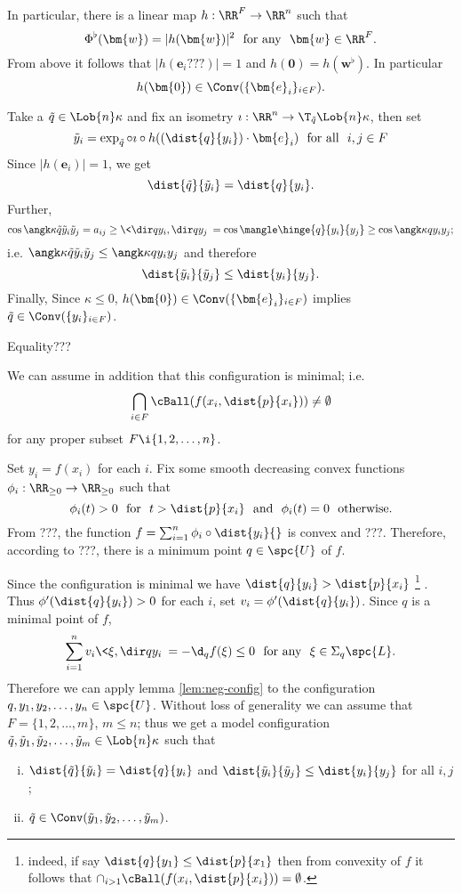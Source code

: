 {In particular, there is a linear map $h:\RR^F\to \RR^n$ such that
$$\Phi^\flat(\bm{w})=|h(\bm{w})|^2 \ \ \text{for any}\ \ \bm{w}\in \RR^F.$$
From above it follows that $|h(\bm{e}_i???)|=1$ and $h(\bm{0})=h(\bm{w}^\flat)$. 
In particular 
$$h(\bm{0}) \in \Conv(\{\bm{e}_i\}_{i\in F}).$$

Take a $\tilde q\in \Lob{n}\kappa$ and fix an isometry $\imath:\RR^n\to \T_{\tilde q}\Lob{n}\kappa$, then set 
$$\tilde y_i=\exp_{\tilde q}\circ\imath\circ h((\dist{q}{y_i})\cdot \bm{e}_i)\ \ \text{for all}\ \ i,j\in F$$ 
Since $|h(\bm{e}_i)|=1$, we get
$$\dist{\tilde q}{\tilde y_i}=\dist{q}{y_i}.$$ 
Further,
$$\cos\angk\kappa{\tilde q}{\tilde y_i}{\tilde y_j}
=a_{i j}
\ge\<\dir q{y_i},\dir q{y_j}\>
= \cos\mangle\hinge{q}{y_i}{y_j}
\ge\cos\angk\kappa{q}{y_i}{y_j};
$$
i.e. $\angk\kappa{\tilde q}{\tilde y_i}{\tilde y_j}\le \angk\kappa{q}{y_i}{y_j}$ and therefore
$$\dist{\tilde y_i}{\tilde y_j}\le \dist{y_i}{y_j}.$$
Finally, Since $\kappa\le 0$, $h(\bm{0}) \in \Conv(\{\bm{e}_i\}_{i\in F})$ implies
$\tilde q\in\Conv(\{y_i\}_{i\in F})$.

Equality???
\qeds












We can assume in addition that this configuration is minimal; 
i.e. 
$$\bigcap_{i\in F} \cBall(f(x_i,\dist{p}{x_i}))\not=\emptyset$$
for any proper subset $F\i\{1,2,\dots,n\}$.

Set $y_i=f(x_i)$ for each $i$.
Fix some smooth decreasing convex functions $\phi_i:\RR_{\ge0}\to\RR_{\ge0}$ such that 
$$\phi_i(t)>0\ \ \text{for}\ \ t> \dist{p}{x_i}\ \ \text{and}\ \ \phi_i(t)=0 \ \ \text{otherwise}.$$
From ???, the function $f=\sum_{i=1}^n \phi_i\circ\dist{y_i}{}$ is convex and ???.
Therefore, according to ???, there is a minimum point $q\in \spc{U}$ of $f$.

Since the configuration is minimal we have $\dist{q}{y_i}>\dist{p}{x_i}$%
\footnote{indeed, if say $\dist{q}{y_1}\le\dist{p}{x_1}$ then from convexity of $f$ it follows that $\cap_{i>1} \cBall(f(x_i,\dist{p}{x_i}))=\emptyset$.}%
.
Thus $\phi'(\dist{q}{y_i})>0$ for each $i$, set $v_i=\phi'(\dist{q}{y_i})$.
Since $q$ is a minimal point of $f$,
$$\sum_{i=1}^n v_i\<\xi,\dir q{y_i}\>
=
-\d_q f(\xi)\le0\ \ \text{for any}\ \ \xi\in \Sigma_q \spc{L}.$$
Therefore we can apply lemma \ref{lem:neg-config} to the configuration $q,y_1,y_2,\dots,y_n\in \spc{U}$.
Without loss of generality we can assume that $F=\{1,2,\dots,m\}$, $m\le n$; 
thus we get a model configuration $\tilde q,\tilde y_1,\tilde y_2,\dots,\tilde y_m\in \Lob{n}\kappa$ such that
\begin{enumerate}[(i)]
\item $\dist{\tilde q}{\tilde y_i}=\dist{q}{y_i}$ and 
$\dist{\tilde y_i}{\tilde y_j}\le \dist{y_i}{y_j}$ for all $i,j$;
\item $\tilde q\in\Conv(\tilde y_1,\tilde y_2,\dots,\tilde y_m)$.
\end{enumerate}

}
